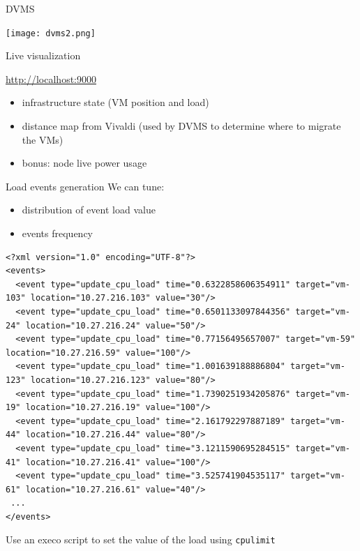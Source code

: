 \documentclass{beamer}
\begin{document}
\begin{frame}{DVMS}
\begin{center}
\texttt{[image: dvms2.png]}
\end{center}
\end{frame}

\begin{frame}{Live visualization}
\begin{center}
    \url{http://localhost:9000}
\end{center}
\begin{itemize}
    \item infrastructure state (VM position and load) 
    \item distance map from Vivaldi (used by DVMS to determine where to migrate the VMs)
    \item bonus: node live power usage
\end{itemize}
\end{frame}
    
\begin{frame}[fragile]{Load events generation}
We can tune:
\begin{itemize}
    \item distribution of event load value
    \item events frequency
\end{itemize}
\tiny
\begin{verbatim}
<?xml version="1.0" encoding="UTF-8"?>
<events>
  <event type="update_cpu_load" time="0.6322858606354911" target="vm-103" location="10.27.216.103" value="30"/>
  <event type="update_cpu_load" time="0.6501133097844356" target="vm-24" location="10.27.216.24" value="50"/>
  <event type="update_cpu_load" time="0.77156495657007" target="vm-59" location="10.27.216.59" value="100"/>
  <event type="update_cpu_load" time="1.001639188886804" target="vm-123" location="10.27.216.123" value="80"/>
  <event type="update_cpu_load" time="1.7390251934205876" target="vm-19" location="10.27.216.19" value="100"/>
  <event type="update_cpu_load" time="2.161792297887189" target="vm-44" location="10.27.216.44" value="80"/>
  <event type="update_cpu_load" time="3.1211590695284515" target="vm-41" location="10.27.216.41" value="100"/>
  <event type="update_cpu_load" time="3.525741904535117" target="vm-61" location="10.27.216.61" value="40"/>
 ...
</events>
\end{verbatim}
\begin{block}{}
\normalsize
Use an execo script to set the value of the load using \verb=cpulimit=
\end{block}
\end{frame}
\end{document}
